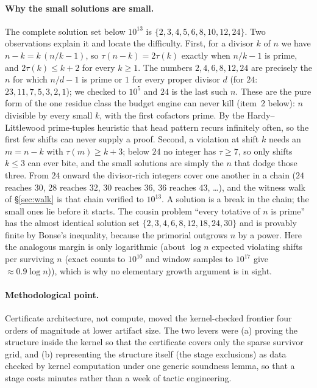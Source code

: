 \documentclass[11pt]{article}
\begin{document}
\paragraph{Why the small solutions are small.} The complete solution set below $10^{13}$ is $\{2,3,4,5,6,8,10,12,24\}$. Two observations explain it and locate the difficulty. First, for a divisor $k$ of $n$ we have $n-k=k\,(n/k-1)$, so $\tau(n-k)=2\tau(k)$ exactly when $n/k-1$ is prime, and $2\tau(k)\le k+2$ for every $k\ge1$. The numbers $2,4,6,8,12,24$ are precisely the $n$ for which $n/d-1$ is prime or $1$ for every proper divisor $d$ (for $24$: $23,11,7,5,3,2,1$); we checked to $10^{5}$ and $24$ is the last such $n$. These are the pure form of the one residue class the budget engine can never kill (item~2 below): $n$ divisible by every small $k$, with the first cofactors prime. By the Hardy--Littlewood prime-tuples heuristic that head pattern recurs infinitely often, so the first few shifts can never supply a proof. Second, a violation at shift $k$ needs an $m=n-k$ with $\tau(m)\ge k+3$; below $24$ no integer has $\tau\ge7$, so only shifts $k\le3$ can ever bite, and the small solutions are simply the $n$ that dodge those three. From $24$ onward the divisor-rich integers cover one another in a chain ($24$ reaches $30$, $28$ reaches $32$, $30$ reaches $36$, $36$ reaches $43$, \dots), and the witness walk of \S\ref{sec:walk} is that chain verified to $10^{13}$. A solution is a break in the chain; the small ones lie before it starts. The cousin problem ``every totative of $n$ is prime'' has the almost identical solution set $\{2,3,4,6,8,12,18,24,30\}$ and is provably finite by Bonse's inequality, because the primorial outgrows $n$ by a power. Here the analogous margin is only logarithmic (about $\log n$ expected violating shifts per surviving $n$ (exact counts to $10^{10}$ and window samples to $10^{17}$ give $\approx 0.9\log n$)), which is why no elementary growth argument is in sight.

\paragraph{Methodological point.} Certificate architecture, not compute, moved the kernel-checked frontier four orders of magnitude at lower artifact size. The two levers were (a) proving the structure inside the kernel so that the certificate covers only the sparse survivor grid, and (b) representing the structure itself (the stage exclusions) as data checked by kernel computation under one generic soundness lemma, so that a stage costs minutes rather than a week of tactic engineering.
\end{document}
